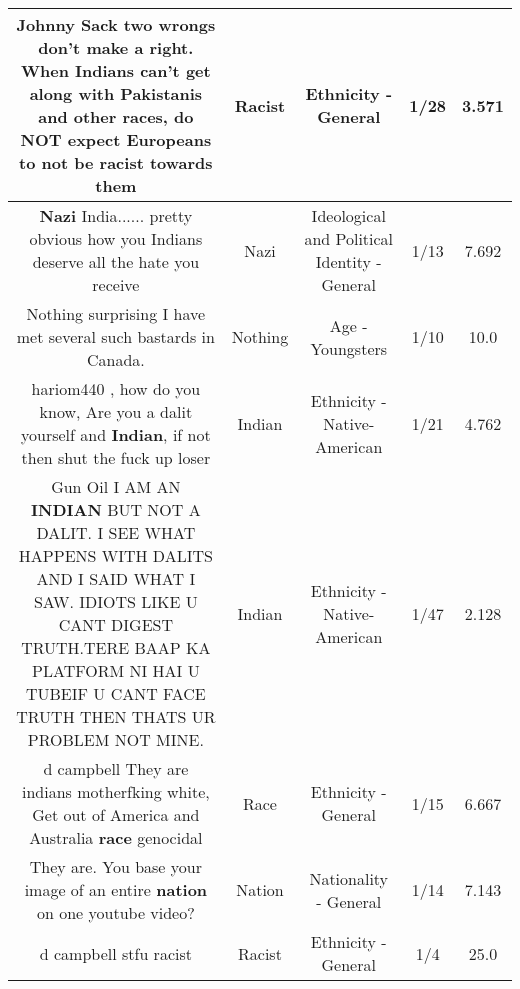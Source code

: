 \documentclass[11pt]{article}
\newlength\mylength
\begin{document}
\begin{center}
\begin{longtable}{|C{.65\mylength}|C{.30\mylength}|C{.12\mylength}|C{.12\mylength}|C{.12\mylength}|}
  \small Johnny Sack two wrongs don't make a right. When Indians can't get along with Pakistanis and other races, do NOT expect Europeans to not be \textbf{racist} towards them\normalsize   & Racist & Ethnicity - General & 1/28 & 3.571 \\  \hline
  \small \@\textbf{Nazi} India...... pretty obvious how you Indians deserve all the hate you receive\normalsize   & Nazi &  Ideological and Political Identity - General & 1/13 & 7.692 \\  \hline
  \small Nothing surprising I have met several such bastards in Canada.\normalsize   & Nothing & Age - Youngsters & 1/10 & 10.0 \\  \hline
  \small hariom440 , how do you know,  Are you a dalit yourself and \textbf{Indian}, if not then shut the fuck up loser\normalsize   & Indian & Ethnicity - Native-American & 1/21 & 4.762 \\  \hline
  \small Gun Oil I AM AN \textbf{INDIAN} BUT NOT A DALIT. I SEE WHAT HAPPENS WITH DALITS AND I SAID WHAT I SAW. IDIOTS LIKE U CANT DIGEST TRUTH.TERE BAAP KA PLATFORM NI HAI U TUBEIF U CANT FACE TRUTH THEN THATS UR PROBLEM NOT MINE.\normalsize   & Indian & Ethnicity - Native-American & 1/47 & 2.128 \\  \hline
  \small d campbell They are indians motherfking white, Get out of America and Australia \textbf{race} genocidal\normalsize   & Race & Ethnicity - General & 1/15 & 6.667 \\  \hline
  \small They are. You base your image of an entire \textbf{nation} on one youtube video?\normalsize   & Nation & Nationality - General & 1/14 & 7.143 \\  \hline
  \small d campbell stfu racist\normalsize   & Racist & Ethnicity - General & 1/4 & 25.0 \\  \hline

\end{longtable}
\end{center}
\end{document}
